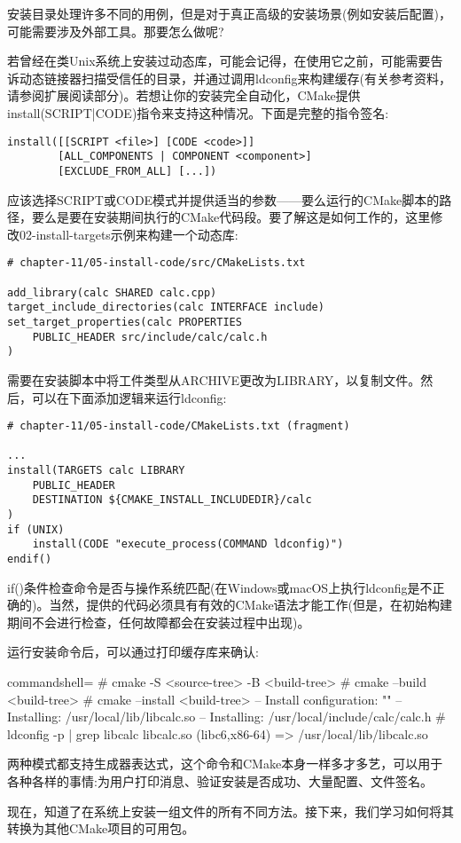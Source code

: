 安装目录处理许多不同的用例，但是对于真正高级的安装场景(例如安装后配置)，可能需要涉及外部工具。那要怎么做呢?


若曾经在类Unix系统上安装过动态库，可能会记得，在使用它之前，可能需要告诉动态链接器扫描受信任的目录，并通过调用ldconfig来构建缓存(有关参考资料，请参阅扩展阅读部分)。若想让你的安装完全自动化，CMake提供install(SCRIPT|CODE)指令来支持这种情况。下面是完整的指令签名:

\begin{lstlisting}[style=styleCMake]
install([[SCRIPT <file>] [CODE <code>]]
		[ALL_COMPONENTS | COMPONENT <component>]
		[EXCLUDE_FROM_ALL] [...])
\end{lstlisting}

应该选择SCRIPT或CODE模式并提供适当的参数——要么运行的CMake脚本的路径，要么是要在安装期间执行的CMake代码段。要了解这是如何工作的，这里修改02-install-targets示例来构建一个动态库:

\begin{lstlisting}[style=styleCMake]
# chapter-11/05-install-code/src/CMakeLists.txt

add_library(calc SHARED calc.cpp)
target_include_directories(calc INTERFACE include)
set_target_properties(calc PROPERTIES
	PUBLIC_HEADER src/include/calc/calc.h
)
\end{lstlisting}

需要在安装脚本中将工件类型从ARCHIVE更改为LIBRARY，以复制文件。然后，可以在下面添加逻辑来运行ldconfig:

\begin{lstlisting}[style=styleCMake]
# chapter-11/05-install-code/CMakeLists.txt (fragment)

...
install(TARGETS calc LIBRARY
	PUBLIC_HEADER
	DESTINATION ${CMAKE_INSTALL_INCLUDEDIR}/calc
)
if (UNIX)
	install(CODE "execute_process(COMMAND ldconfig)")
endif()
\end{lstlisting}

if()条件检查命令是否与操作系统匹配(在Windows或macOS上执行ldconfig是不正确的)。当然，提供的代码必须具有有效的CMake语法才能工作(但是，在初始构建期间不会进行检查，任何故障都会在安装过程中出现)。

运行安装命令后，可以通过打印缓存库来确认:

\begin{tcblisting}{commandshell={}}
# cmake -S <source-tree> -B <build-tree>
# cmake --build <build-tree>
# cmake --install <build-tree>
-- Install configuration: ""
-- Installing: /usr/local/lib/libcalc.so
-- Installing: /usr/local/include/calc/calc.h
# ldconfig -p | grep libcalc
          libcalc.so (libc6,x86-64) => /usr/local/lib/libcalc.so
\end{tcblisting}

两种模式都支持生成器表达式，这个命令和CMake本身一样多才多艺，可以用于各种各样的事情:为用户打印消息、验证安装是否成功、大量配置、文件签名。

现在，知道了在系统上安装一组文件的所有不同方法。接下来，我们学习如何将其转换为其他CMake项目的可用包。




